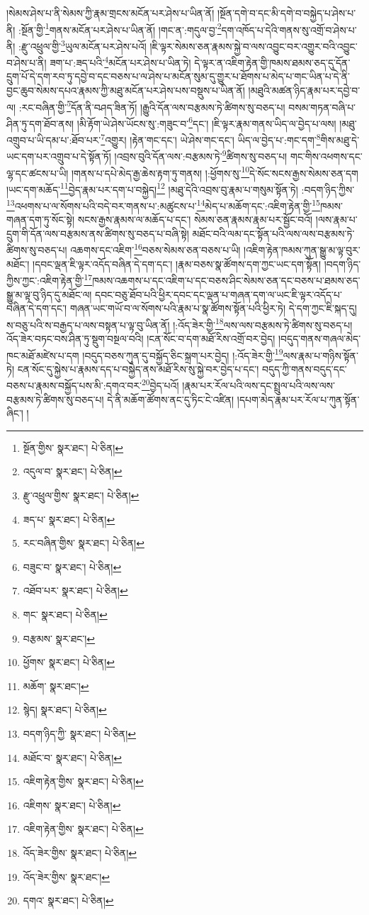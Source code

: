 །སེམས་ཤེས་པ་ནི་སེམས་ཀྱི་རྣམ་གྲངས་མངོན་པར་ཤེས་པ་ཡིན་ནོ། །སྔོན་དགེ་བ་དང་མི་དགེ་བ་བསྐྱེད་པ་ཤེས་པ་ནི། :སྔོན་གྱི་\footnote{སྔོན་གྱིས་  སྣར་ཐང་།  པེ་ཅིན། }གནས་མངོན་པར་ཤེས་པ་ཡིན་ནོ། །གང་ན་:གདུལ་བྱ་\footnote{འདུལ་བ་  སྣར་ཐང་།  པེ་ཅིན། }དག་འཁོད་པ་དེའི་གནས་སུ་འགྲོ་བ་ཤེས་པ་ནི། :རྫུ་འཕྲུལ་གྱི་\footnote{རྫུ་འཕྲུལ་གྱིས་  སྣར་ཐང་།  པེ་ཅིན། }ཡུལ་མངོན་པར་ཤེས་པའོ། །ཇི་ལྟར་སེམས་ཅན་རྣམས་སྐྱེ་བ་ལས་འབྱུང་བར་འགྱུར་བའི་འབྱུང་བ་ཤེས་པ་ནི། ཟག་པ་:ཟད་པའི་\footnote{ཟད་པ་  སྣར་ཐང་།  པེ་ཅིན། }མངོན་པར་ཤེས་པ་ཡིན་ཏེ། དེ་ལྟར་ན་འཇིག་རྟེན་གྱི་ཁམས་ཐམས་ཅད་དུ་དོན་དྲུག་པོ་དེ་དག་རབ་ཏུ་དབྱེ་བ་དང་བཅས་པ་ལ་ཤེས་པ་མངོན་སུམ་དུ་གྱུར་པ་ཐོགས་པ་མེད་པ་གང་ཡིན་པ་དེ་ནི་བྱང་ཆུབ་སེམས་དཔའ་རྣམས་ཀྱི་མཐུ་མངོན་པར་ཤེས་པས་བསྡུས་པ་ཡིན་ནོ། །མཐུའི་མཚན་ཉིད་རྣམ་པར་དབྱེ་བ་ལ། :རང་བཞིན་གྱི་\footnote{རང་བཞིན་གྱིས་  སྣར་ཐང་།  པེ་ཅིན། }དོན་ནི་བཤད་ཟིན་ཏོ། །རྒྱུའི་དོན་ལས་བརྩམས་ཏེ་ཚིགས་སུ་བཅད་པ། བསམ་གཏན་བཞི་པ་ཤིན་ཏུ་དག་ཐོབ་ནས། །མི་རྟོག་ཡེ་ཤེས་ཡོངས་སུ་:གཟུང་བ་\footnote{བཟུང་བ་  སྣར་ཐང་།  པེ་ཅིན། }དང་། །ཇི་ལྟར་རྣམ་གནས་ཡིད་ལ་བྱེད་པ་ལས། །མཐུ་འགྲུབ་པ་ཡི་དམ་པ་:ཐོབ་པར་\footnote{འཐོབ་པར་  སྣར་ཐང་།  པེ་ཅིན། }འགྱུར། །རྟེན་གང་དང་། ཡེ་ཤེས་གང་དང་། ཡིད་ལ་བྱེད་པ་:གང་དག་\footnote{གང་  སྣར་ཐང་།  པེ་ཅིན། }གིས་མཐུ་དེ་ཡང་དག་པར་འགྲུབ་པ་དེ་སྟོན་ཏོ། །འབྲས་བུའི་དོན་ལས་:བརྩམས་ཏེ་\footnote{བརྩམས་  སྣར་ཐང་། }ཚིགས་སུ་བཅད་པ། གང་གིས་འཕགས་དང་ལྷ་དང་ཚངས་པ་ཡི། །གནས་པ་དཔེ་མེད་རྒྱ་ཆེས་རྟག་ཏུ་གནས། །:ཕྱོགས་སུ་\footnote{ཕྱོགས་  སྣར་ཐང་།  པེ་ཅིན། }དེ་སོང་སངས་རྒྱས་སེམས་ཅན་དག །ཡང་དག་མཆོད་\footnote{མཆོག་  སྣར་ཐང་། }བྱེད་རྣམ་པར་དག་པ་བསྐྱེད།\footnote{སྙེད།  སྣར་ཐང་།  པེ་ཅིན། } །མཐུ་དེའི་འབྲས་བུ་རྣམ་པ་གསུམ་སྟོན་ཏེ། :བདག་ཉིད་ཀྱིས་\footnote{བདག་ཉིད་ཀྱི་  སྣར་ཐང་།  པེ་ཅིན། }འཕགས་པ་ལ་སོགས་པའི་བདེ་བར་གནས་པ་:མཚུངས་པ་\footnote{མཐོང་བ་  སྣར་ཐང་།  པེ་ཅིན། }མེད་པ་མཆོག་དང་:འཇིག་རྟེན་གྱི་\footnote{འཇིག་རྟེན་གྱིས་  སྣར་ཐང་།  པེ་ཅིན། }ཁམས་གཞན་དག་ཏུ་སོང་སྟེ། སངས་རྒྱས་རྣམས་ལ་མཆོད་པ་དང་། སེམས་ཅན་རྣམས་རྣམ་པར་སྦྱོང་བའོ། །ལས་རྣམ་པ་དྲུག་གི་དོན་ལས་བརྩམས་ནས་ཚིགས་སུ་བཅད་པ་བཞི་སྟེ། མཐོང་བའི་ལམ་དང་སྟོན་པའི་ལས་ལས་བརྩམས་ཏེ་ཚིགས་སུ་བཅད་པ། འཆགས་དང་འཇིག་\footnote{འཇིགས་  སྣར་ཐང་།  པེ་ཅིན། }བཅས་སེམས་ཅན་བཅས་པ་ཡི། །འཇིག་རྟེན་ཁམས་ཀུན་སྒྱུ་མ་ལྟ་བུར་མཐོང་། །དབང་ལྡན་ཇི་ལྟར་འདོད་བཞིན་དེ་དག་དང་། །རྣམ་བཅས་སྣ་ཚོགས་དག་ཀྱང་ཡང་དག་སྟོན། །བདག་ཉིད་ཀྱིས་ཀྱང་:འཇིག་རྟེན་གྱི་\footnote{འཇིག་རྟེན་གྱིས་  སྣར་ཐང་།  པེ་ཅིན། }ཁམས་འཆགས་པ་དང་འཇིག་པ་དང་བཅས་ཤིང་སེམས་ཅན་དང་བཅས་པ་ཐམས་ཅད་སྒྱུ་མ་ལྟ་བུ་ཉིད་དུ་མཐོང་ལ། དབང་བཅུ་ཐོབ་པའི་ཕྱིར་དབང་དང་ལྡན་པ་གཞན་དག་ལ་ཡང་ཇི་ལྟར་འདོད་པ་བཞིན་དེ་དག་དང་། གཞན་ཡང་གཡོ་བ་ལ་སོགས་པའི་རྣམ་པ་སྣ་ཚོགས་སྟོན་པའི་ཕྱིར་ཏེ། དེ་དག་ཀྱང་ཇི་སྐད་དུ། ས་བཅུ་པའི་ས་བརྒྱད་པ་ལས་བསྟན་པ་ལྟ་བུ་ཡིན་ནོ། །:འོད་ཟེར་གྱི་\footnote{འོད་ཟེར་གྱིས་  སྣར་ཐང་།  པེ་ཅིན། }ལས་ལས་བརྩམས་ཏེ་ཚིགས་སུ་བཅད་པ། འོད་ཟེར་བཏང་བས་ཤིན་ཏུ་སྡུག་བསྔལ་བའི། །ངན་སོང་བ་དག་མཐོ་རིས་འགྲོ་བར་བྱེད། །བདུད་གནས་གཞལ་མེད་ཁང་མཐོ་མཛེས་པ་དག །བདུད་བཅས་ཀུན་དུ་བསྐྱོད་ཅིང་སྐྲག་པར་བྱེད། །:འོད་ཟེར་གྱི་\footnote{འོད་ཟེར་གྱིས་  སྣར་ཐང་། }ལས་རྣམ་པ་གཉིས་སྟོན་ཏེ། ངན་སོང་དུ་སྐྱེས་པ་རྣམས་དད་པ་བསྐྱེད་ནས་མཐོ་རིས་སུ་སྐྱེ་བར་བྱེད་པ་དང་། བདུད་ཀྱི་གནས་བདུད་དང་བཅས་པ་རྣམས་བསྐྱོད་པས་མི་:དགའ་བར་\footnote{དགའ་  སྣར་ཐང་།  པེ་ཅིན། }བྱེད་པའོ། །རྣམ་པར་རོལ་པའི་ལས་དང་སྤྲུལ་པའི་ལས་ལས་བརྩམས་ཏེ་ཚིགས་སུ་བཅད་པ། དེ་ནི་མཆོག་ཚོགས་ནང་དུ་ཏིང་ངེ་འཛིན། །དཔག་མེད་རྣམ་པར་རོལ་པ་ཀུན་སྟོན་ཞིང་། །
